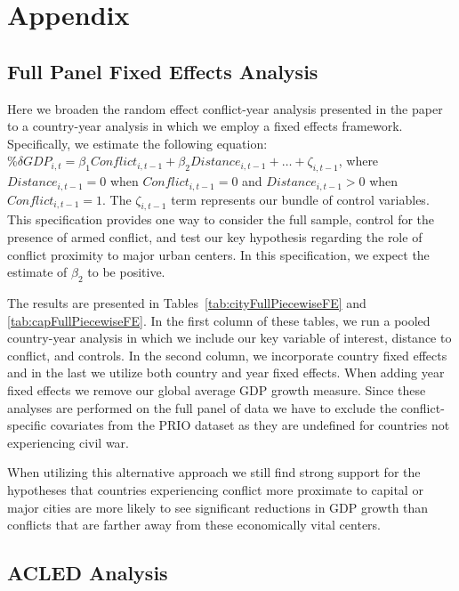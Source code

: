 
\newpage
\section{Appendix}
\label{appendix}

\subsection{Full Panel Fixed Effects Analysis}

Here we broaden the random effect conflict-year analysis presented in the paper to a country-year analysis in which we employ a fixed effects framework. Specifically, we estimate the following equation: $\% \delta GDP_{i,t} = \beta_{1}Conflict_{i,t-1} + \beta_{2}Distance_{i,t-1}+\ldots+\zeta_{i,t-1}$, where $Distance_{i,t-1}=0$ when $Conflict_{i,t-1}=0$ and $Distance_{i,t-1}>0$ when $Conflict_{i,t-1}=1$. The $\zeta_{i,t-1}$ term represents our bundle of control variables. This specification provides one way to consider the full sample, control for the presence of armed conflict, and test our key hypothesis regarding the role of conflict proximity to major urban centers. In this specification, we expect the estimate of $\beta_{2}$ to be positive.

The results are presented in Tables~\ref{tab:cityFullPiecewiseFE} and \ref{tab:capFullPiecewiseFE}. In the first column of these tables, we run a pooled country-year analysis in which we include our key variable of interest, distance to conflict, and controls. In the second column, we incorporate country fixed effects and in the last we utilize both country and year fixed effects. When adding year fixed effects we remove our global average GDP growth measure. Since these analyses are performed on the full panel of data we have to exclude the conflict-specific covariates from the PRIO dataset as they are undefined for countries not experiencing civil war. 

When utilizing this alternative approach we still find strong support for the hypotheses that countries experiencing conflict more proximate to capital or major cities are more likely to see significant reductions in GDP growth than conflicts that are farther away from these economically vital centers.


\FloatBarrier


\FloatBarrier

\newpage
\subsection{ACLED Analysis}
\label{acled}

